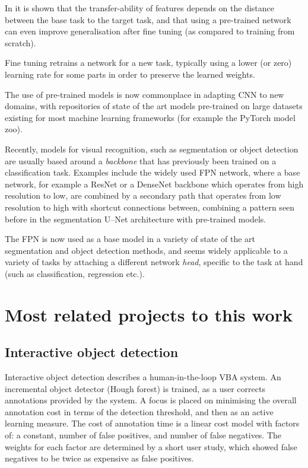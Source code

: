 In \cite{Yosinski} it is shown that the transfer-ability of features depends on the distance between the base task to the target task, and that using a pre-trained network can even improve generalisation after fine tuning (as compared to training from scratch).

Fine tuning retrains a network for a new task, typically using a lower (or zero) learning rate for some parts in order to preserve the learned weights. 

The use of pre-trained models is now commonplace in adapting \gls{CNN} to new domains, with repositories of state of the art models pre-trained on large datasets existing for most machine learning frameworks (for example the PyTorch \cite{Paszke2017} model zoo). 

Recently, models for visual recognition, such as segmentation or object detection are usually based around a \emph{backbone} that has previously been trained on a classification task. Examples include the widely used \gls{FPN} network, \cite{Lin2017a} where a base network, for example a ResNet \cite{He} or a DenseNet \cite{Huang2016} backbone which operates from high resolution to low, are combined by a secondary path that operates from low resolution to high with shortcut connections between, combining a pattern seen before in the segmentation U--Net \cite{Ronneberger2015} architecture with pre-trained models.

The \gls{FPN} is now used as a base model in a variety of state of the art segmentation and object detection methods, and seems widely applicable to a variety of tasks by attaching a different network \emph{head}, specific to the task at hand (such as classification, regression etc.).


\section {Most related projects to this work}
\label{sec:closest}

\subsection {Interactive object detection \cite{Yao2012}}

Interactive object detection \cite{Yao2012} describes a human-in-the-loop \gls{VBA} system. An incremental object detector (Hough forest) is trained, as a user corrects annotations provided by the system. A focus is placed on minimising the overall annotation cost in terms of the detection threshold, and then as an active learning measure. 
The cost of annotation time is a linear cost model with factors of: a constant, number of false positives, and number of false negatives. The weights for each factor are determined by a short user study, which showed false negatives to be twice as expensive as false positives. 


